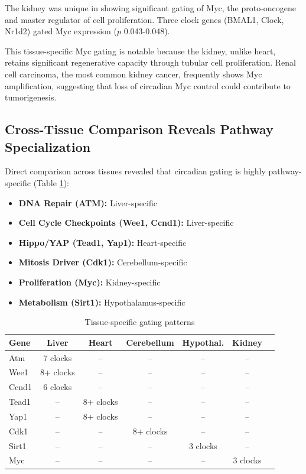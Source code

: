 \documentclass[10pt,letterpaper]{article}
\begin{document}
The kidney was unique in showing significant gating of Myc, the proto-oncogene and master regulator of cell proliferation. Three clock genes (BMAL1, Clock, Nr1d2) gated Myc expression ($p$ 0.043-0.048).

This tissue-specific Myc gating is notable because the kidney, unlike heart, retains significant regenerative capacity through tubular cell proliferation. Renal cell carcinoma, the most common kidney cancer, frequently shows Myc amplification, suggesting that loss of circadian Myc control could contribute to tumorigenesis.

\subsection{Cross-Tissue Comparison Reveals Pathway Specialization}

Direct comparison across tissues revealed that circadian gating is highly pathway-specific (Table \ref{tab:pathway_comparison}):

\begin{itemize}
    \item \textbf{DNA Repair (ATM):} Liver-specific
    \item \textbf{Cell Cycle Checkpoints (Wee1, Ccnd1):} Liver-specific
    \item \textbf{Hippo/YAP (Tead1, Yap1):} Heart-specific
    \item \textbf{Mitosis Driver (Cdk1):} Cerebellum-specific
    \item \textbf{Proliferation (Myc):} Kidney-specific
    \item \textbf{Metabolism (Sirt1):} Hypothalamus-specific
\end{itemize}

\begin{table}[H]
\centering
\caption{Tissue-specific gating patterns}
\label{tab:pathway_comparison}
\begin{tabular}{lcccccc}
\toprule
\textbf{Gene} & \textbf{Liver} & \textbf{Heart} & \textbf{Cerebellum} & \textbf{Hypothal.} & \textbf{Kidney} \\
\midrule
Atm & 7 clocks & -- & -- & -- & -- \\
Wee1 & 8+ clocks & -- & -- & -- & -- \\
Ccnd1 & 6 clocks & -- & -- & -- & -- \\
Tead1 & -- & 8+ clocks & -- & -- & -- \\
Yap1 & -- & 8+ clocks & -- & -- & -- \\
Cdk1 & -- & -- & 8+ clocks & -- & -- \\
Sirt1 & -- & -- & -- & 3 clocks & -- \\
Myc & -- & -- & -- & -- & 3 clocks \\
\bottomrule
\end{tabular}
\end{table}
\end{document}
